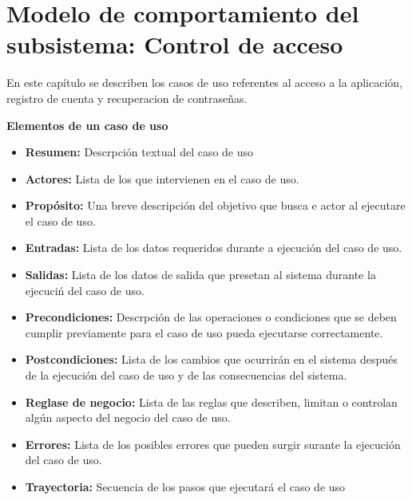 \chapter{Modelo de comportamiento del subsistema: Control de acceso}
\label{cap:reqSist}

En este capítulo se describen los casos de uso referentes al acceso a la aplicación, registro de cuenta y recuperacion de contraseñas.


\begin{shaded}
		\textcolor{NavyBlue}{\Large\textbf{Elementos de un caso de uso}}
		\begin{itemize}
			\item \textbf{Resumen:} Descrpción textual del caso de uso
			\item \textbf{Actores:} Lista de los que  intervienen en el caso de uso.
			\item \textbf{Propósito:} Una breve descripción del objetivo que busca e actor al ejecutare el caso de uso.
			\item \textbf{Entradas:} Lista de los datos requeridos durante a ejecución del caso de uso.
			\item \textbf{Salidas:} Lista de los datos de salida que presetan al sistema durante la ejecuciń del caso de uso.
			\item \textbf{Precondiciones:} Descrpción de las operaciones o condiciones que se deben cumplir previamente para el caso de uso pueda ejecutarse correctamente.
			\item \textbf{Postcondiciones:} Lista de los cambios que ocurrirán en el sistema después de la ejecución del caso de uso y de las consecuencias del sistema.
			\item \textbf{Reglase de negocio:} Lista de las reglas que describen, limitan o controlan algún aspecto del negocio del caso de uso.
			\item \textbf{Errores:} Lista de los posibles errores que pueden surgir surante la ejecución del caso de uso.
			\item \textbf{Trayectoria:} Secuencia de los pasos que ejecutará el caso de uso
		\end{itemize}		
	\end{shaded}
\newpage





